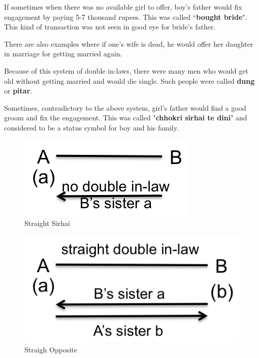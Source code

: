 If sometimes when there was no available girl to offer, boy's father would fix
engagement by paying 5-7 thousand rupees. This was called ``\textbf{bought
bride}". This kind of transaction was not seen in good eye for bride's father.

There are also examples where if one's wife is dead, he would offer her
daughter in marriage for getting married again. 

Because of this system of double in-laws, there were many men who would get old
without getting married and would die single. Such people were called
\textbf{dung} or \textbf{pitar}.

Sometimes, contradictory to the above system, girl's father would find a good
groom and fix the engagement. This was called "\textbf{chhokri sirhai te dini}"
and considered to be a status symbol for boy and his family.

\begin{figure}
\center
\includegraphics{figures/engagement/straight-sirhai}
\caption{ Straight Sirhai
\label{figure:engage_1}}
\end{figure}

\begin{figure}
\center
\includegraphics{figures/engagement/straight_opposite_2}
\caption{ Straigh Opposite
\label{figure:engage_2}}
\end{figure}

